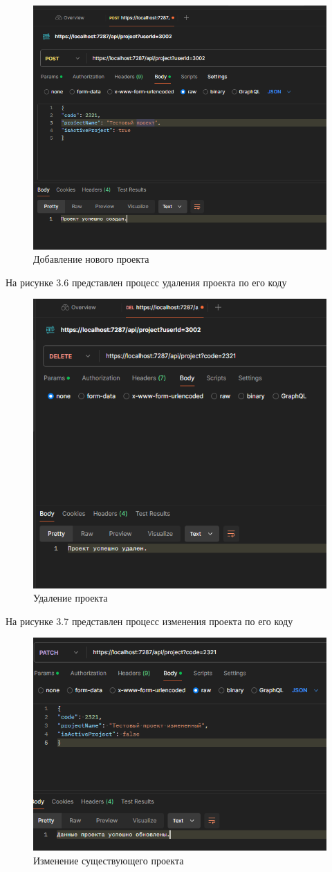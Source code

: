 \begin{figure}[H]
	\centering
	\includegraphics[width=0.65\linewidth]{images/PostProject}
	\caption{Добавление нового проекта}
	\label{fig:postproject}
\end{figure}

На рисунке 3.6 представлен процесс удаления проекта по его коду

\begin{figure}[H]
	\centering
	\includegraphics[width=0.7\linewidth]{images/deleteProject}
	\caption{Удаление проекта}
	\label{fig:deleteproject}
\end{figure}

На рисунке 3.7 представлен процесс изменения проекта по его коду
\begin{figure}[H]
	\centering
	\includegraphics[width=0.7\linewidth]{images/PatchProject}
	\caption{Изменение существующего проекта}
	\label{fig:patchproject}
\end{figure}
